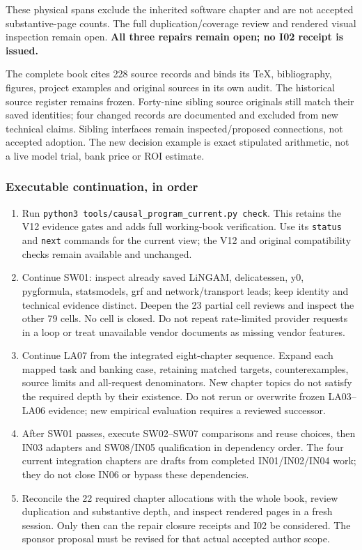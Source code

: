 \documentclass[
  11pt,
  a4paper,
]{article}
\providecommand{\tightlist}{%
  \setlength{\itemsep}{0pt}\setlength{\parskip}{0pt}}
\begin{document}
These physical spans exclude the inherited software chapter and are not
accepted substantive-page counts. The full duplication/coverage review
and rendered visual inspection remain open. \textbf{All three repairs
remain open; no I02 receipt is issued.}

The complete book cites 228 source records and binds its TeX,
bibliography, figures, project examples and original sources in its own
audit. The historical source register remains frozen. Forty-nine sibling
source originals still match their saved identities; four changed
records are documented and excluded from new technical claims. Sibling
interfaces remain inspected/proposed connections, not accepted adoption.
The new decision example is exact stipulated arithmetic, not a live
model trial, bank price or ROI estimate.

\hypertarget{executable-continuation-in-order}{%
\subsubsection{Executable continuation, in
order}\label{executable-continuation-in-order}}

\begin{enumerate}
\def\labelenumi{\arabic{enumi}.}
\tightlist
\item
  Run \texttt{python3\ tools/causal\_program\_current.py\ check}. This
  retains the V12 evidence gates and adds full working-book
  verification. Use its \texttt{status} and \texttt{next} commands for
  the current view; the V12 and original compatibility checks remain
  available and unchanged.
\item
  Continue SW01: inspect already saved LiNGAM, delicatessen, y0,
  pygformula, statsmodels, grf and network/transport leads; keep
  identity and technical evidence distinct. Deepen the 23 partial cell
  reviews and inspect the other 79 cells. No cell is closed. Do not
  repeat rate-limited provider requests in a loop or treat unavailable
  vendor documents as missing vendor features.
\item
  Continue LA07 from the integrated eight-chapter sequence. Expand each
  mapped task and banking case, retaining matched targets,
  counterexamples, source limits and all-request denominators. New
  chapter topics do not satisfy the required depth by their existence.
  Do not rerun or overwrite frozen LA03--LA06 evidence; new empirical
  evaluation requires a reviewed successor.
\item
  After SW01 passes, execute SW02--SW07 comparisons and reuse choices,
  then IN03 adapters and SW08/IN05 qualification in dependency order.
  The four current integration chapters are drafts from completed
  IN01/IN02/IN04 work; they do not close IN06 or bypass these
  dependencies.
\item
  Reconcile the 22 required chapter allocations with the whole book,
  review duplication and substantive depth, and inspect rendered pages
  in a fresh session. Only then can the repair closure receipts and I02
  be considered. The sponsor proposal must be revised for that actual
  accepted author scope.
\end{enumerate}
\end{document}
